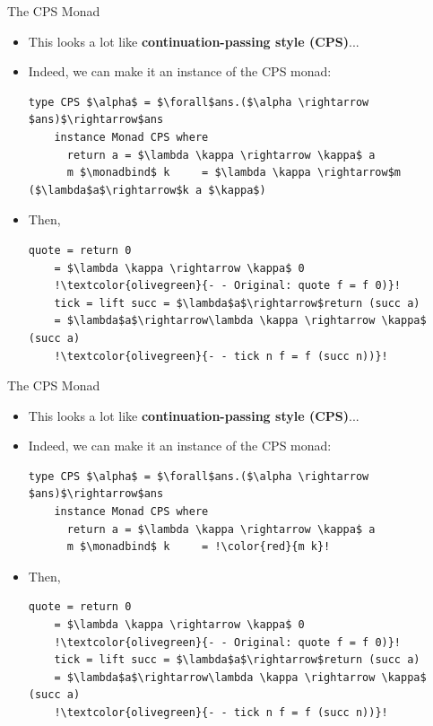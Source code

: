 \documentclass[10pt]{beamer}
\newcommand\monadbind{\gg\!\!=}
\begin{document}
\begin{frame}[fragile]{The CPS Monad}

\begin{itemize}

\item This looks a lot like \textbf{continuation-passing style (CPS)}...
\item Indeed, we can make it an instance of the CPS monad:

\begin{lstlisting}[mathescape=true]
	type CPS $\alpha$ = $\forall$ans.($\alpha \rightarrow $ans)$\rightarrow$ans
	instance Monad CPS where
	  return a = $\lambda \kappa \rightarrow \kappa$ a
	  m $\monadbind$ k     = $\lambda \kappa \rightarrow$m ($\lambda$a$\rightarrow$k a $\kappa$)
\end{lstlisting}

\item Then, 
\begin{lstlisting}[mathescape=true, escapechar=!]
	quote = return 0
	= $\lambda \kappa \rightarrow \kappa$ 0
	!\textcolor{olivegreen}{- - Original: quote f = f 0)}!
	tick = lift succ = $\lambda$a$\rightarrow$return (succ a)
	= $\lambda$a$\rightarrow\lambda \kappa \rightarrow \kappa$ (succ a)
	!\textcolor{olivegreen}{- - tick n f = f (succ n))}!
\end{lstlisting}

\end{itemize}

\end{frame}

\begin{frame}[fragile]{The CPS Monad}

\begin{itemize}

\item This looks a lot like \textbf{continuation-passing style (CPS)}...
\item Indeed, we can make it an instance of the CPS monad:

\begin{lstlisting}[mathescape=true, escapechar=!]
	type CPS $\alpha$ = $\forall$ans.($\alpha \rightarrow $ans)$\rightarrow$ans
	instance Monad CPS where
	  return a = $\lambda \kappa \rightarrow \kappa$ a
	  m $\monadbind$ k     = !\color{red}{m k}!
\end{lstlisting}

\item Then, 
\begin{lstlisting}[mathescape=true, escapechar=!]
	quote = return 0
	= $\lambda \kappa \rightarrow \kappa$ 0
	!\textcolor{olivegreen}{- - Original: quote f = f 0)}!
	tick = lift succ = $\lambda$a$\rightarrow$return (succ a)
	= $\lambda$a$\rightarrow\lambda \kappa \rightarrow \kappa$ (succ a)
	!\textcolor{olivegreen}{- - tick n f = f (succ n))}!
\end{lstlisting}

\end{itemize}

\end{frame}
\end{document}
